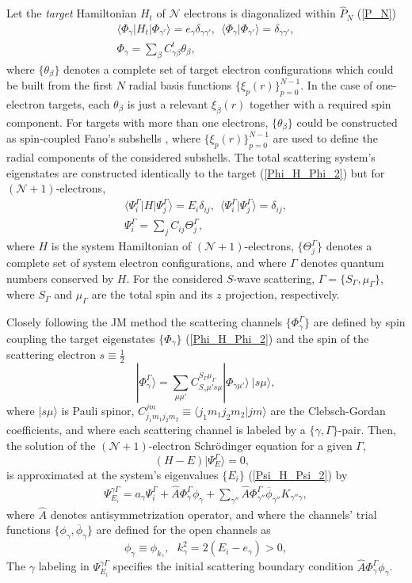 \documentclass[aip
, pra
, showpacs
, aps
, twocolumn
, groupedaddress
, floatfix
]{revtex4}
\newcommand{\beq}{\begin{equation}}
\newcommand{\eeq}{\end{equation}}
\newcommand{\barr}{\begin{array}}
\newcommand{\earr}{\end{array}}
\begin{document}
Let the {\em target} Hamiltonian $H_t$ of
$\mathcal{N}$ electrons
is diagonalized within $\hat{P}_N$ (\ref{P_N})
\beq \barr{l}
\langle \Phi_\gamma|H_t|\Phi_{\gamma'}\rangle=e_\gamma \delta_{\gamma\gamma'}, \ \
\langle \Phi_\gamma|\Phi_{\gamma'}\rangle=\delta_{\gamma\gamma'},\\
\Phi_\gamma = \sum_{\beta} C^t_{\gamma \beta} \theta_\beta,
\earr \label{Phi_H_Phi_2} \eeq
where $\{\theta_\beta\}$ denotes a complete set of target electron configurations which could be built from
the first $N$ radial basis functions $\{\xi_p(r)\}_{p=0}^{N-1}$.
In the case of one-electron targets, each
$\theta_\beta$ is just a relevant $\xi_\beta(r)$ together with a required spin component.
For targets with more than one electrons, $\{\theta_\beta\}$ could be constructed as spin-coupled Fano's subshells \cite{Fano65,KFB11},
where $\{\xi_p(r)\}_{p=0}^{N-1}$ are used to define the radial components of the considered subshells.
The total scattering system's eigenstates are constructed identically to the target (\ref{Phi_H_Phi_2})
but for $(\mathcal{N}+1)$-electrons,
\beq \barr{l}
\langle\Psi_i^\Gamma|H|\Psi_j^\Gamma\rangle=E_i\delta_{ij}, \ \
 \langle\Psi_i^\Gamma|\Psi_j^\Gamma\rangle=\delta_{ij},\\
\Psi^\Gamma_i = \sum_{j} C_{ij} \Theta^\Gamma_j,
\earr \label{Psi_H_Psi_2} \eeq
where $H$ is the system Hamiltonian of $(\mathcal{N}+1)$-electrons, $\{\Theta_j^\Gamma\}$
denotes a complete set of system electron configurations, and where
$\Gamma$ denotes quantum numbers conserved by $H$.
For the considered $S$-wave scattering,
$\Gamma=\{S_\Gamma,\mu_\Gamma\}$, where $S_\Gamma$ and $\mu_\Gamma$ are the total spin and its $z$ projection, respectively.


Closely following the JM method \cite{BR76p1491, KFB11} the scattering channels $\{\Phi_\gamma^\Gamma\}$ are defined by spin coupling the target eigenstates
$\{\Phi_\gamma\}$ (\ref{Phi_H_Phi_2})
and the spin of the scattering electron
$s\equiv \frac{1}{2}$
\beq
| \Phi_{\gamma}^{\Gamma} \rangle = \sum_{\mu \mu'}
C_{S_\gamma \mu' s \mu}^{S_\Gamma \mu_\Gamma}
|\Phi_{\gamma \mu'} \rangle \ |s \mu  \rangle,
\label{chi_phi_Gamma} \eeq
where $|s \mu \rangle$ is Pauli spinor,
$C_{j_1m_1j_2m_2}^{jm} \equiv \langle j_1m_1 j_2 m_2| jm\rangle$ are the Clebsch-Gordan coefficients,
and where each scattering channel is labeled by a $\{\gamma, \Gamma\}$-pair.
Then, the solution of the $(\mathcal{N}+1)$-electron Schr\"odinger equation for a given $\Gamma$,
\beq
(H-E) | \Psi^\Gamma_E \rangle =0,  \ \ \  \label{H_E_Psi_E_2}
\eeq
is approximated at the system's eigenvalues $\{E_i\}$ (\ref{Psi_H_Psi_2}) by
\beq \barr{l}
 \Psi_{E_i}^{\gamma \Gamma}  =  a_\gamma \Psi_i^{\Gamma}
 + \hat{A} \Phi^\Gamma_{\gamma}  \phi_{\gamma}
+ \sum_{\gamma''}  \hat{A} \Phi^\Gamma_{\gamma''}   \overline{\phi}_{\gamma''}  K_{\gamma'' \gamma},
\earr \label{Psi_} \eeq
where $\hat{A}$ denotes antisymmetrization operator,
and where the channels' trial functions $\{ \phi_\gamma, \overline{\phi}_\gamma \}$ are defined for the open channels as
\beq
\phi_{\gamma}\equiv \phi_{k_\gamma}, \ \ \   k_{\gamma}^2 = 2(E_i - e_\gamma) > 0,
\eeq
The $\gamma$ labeling in $\Psi_{E_i}^{\gamma \Gamma}$ specifies the initial scattering boundary condition $\hat{A} \Phi^\Gamma_{\gamma}  \phi_{\gamma}$.
\end{document}
